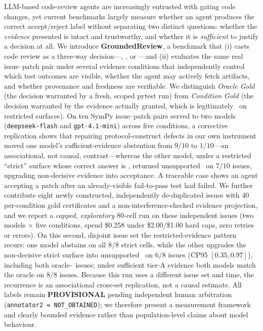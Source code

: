 LLM-based code-review agents are increasingly entrusted with gating code
changes, yet current benchmarks largely measure whether an agent produces the
correct accept/reject label without separating two distinct questions: whether
the \emph{evidence} presented is intact and trustworthy, and whether it is
\emph{sufficient} to justify a decision at all. We introduce
\textbf{GroundedReview}, a benchmark that (i) casts code review as a three-way
decision---\ACCEPT, \REJECT, or \NEED---and (ii) evaluates the same real
issue--patch pair under several evidence conditions that independently control
which test outcomes are visible, whether the agent may actively fetch
artifacts, and whether provenance and freshness are verifiable. We distinguish
\emph{Oracle Gold} (the decision warranted by a fresh, scoped pytest run) from
\emph{Condition Gold} (the decision warranted by the evidence actually
granted, which is legitimately \NEED\ on restricted surfaces). On ten SymPy
issue--patch pairs served to two models (\texttt{deepseek-flash} and
\texttt{gpt-4.1-mini}) across five conditions, a corrective replication shows
that repairing protocol-construct defects in our own instrument moved one
model's sufficient-evidence abstention from $9/10$ to $1/10$---an
associational, not causal, contrast---whereas the other model, under a
restricted ``strict'' surface whose correct answer is \NEED, returned
unsupported \ACCEPT\ on $7/10$ issues, upgrading non-decisive evidence into
acceptance. A traceable case shows an agent accepting a patch after an
already-visible fail-to-pass test had failed. We further contribute eight
newly constructed, independently de-duplicated issues with 40 per-condition
gold certificates and a non-interference-checked evidence projection, and we
report a \emph{capped, exploratory} 80-cell run on these independent issues
(two models $\times$ five conditions, spend \$0.258 under \$2.00/\$1.00
hard caps, zero retries or errors). On this second, disjoint issue set the
restricted-evidence pattern recurs: one model abstains on all $8/8$ strict
cells, while the other upgrades the non-decisive strict surface into
unsupported \ACCEPT\ on $6/8$ issues (CP95 $[0.35,0.97]$), including both
oracle-\REJECT\ issues; under sufficient tier-A evidence both models match
the oracle on $8/8$ issues. Because this run uses a different issue set and
time, the recurrence is an associational cross-set replication, not a causal
estimate. All labels remain \textbf{PROVISIONAL} pending independent human
arbitration (\texttt{annotator2 = NOT\_OBTAINED}); we therefore present a
measurement framework and clearly bounded evidence rather than
population-level claims about model behaviour.
